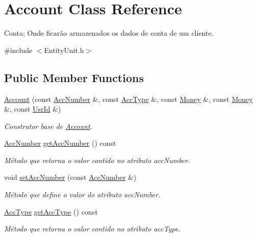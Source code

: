 \hypertarget{classAccount}{\section{Account Class Reference}
\label{d7/d10/classAccount}
}


Conta; Onde ficarão armazenados os dados de conta de um cliente.  




{\ttfamily \#include $<$Entity\-Unit.\-h$>$}

\subsection*{Public Member Functions}
\begin{DoxyCompactItemize}
\item 
\hyperlink{classAccount_a94113be123fc89c3de8461cbb8251c83}{Account} (const \hyperlink{classAccNumber}{Acc\-Number} \&, const \hyperlink{classUsrType}{Acc\-Type} \&, const \hyperlink{classMoney}{Money} \&, const \hyperlink{classMoney}{Money} \&, const \hyperlink{classUsrId}{Usr\-Id} \&)
\begin{DoxyCompactList}\small\item\em Construtor base de \hyperlink{classAccount}{Account}. \end{DoxyCompactList}\item 
\hyperlink{classAccNumber}{Acc\-Number} \hyperlink{classAccount_a74f26f24e13e66a055bb8441dfb3d881}{get\-Acc\-Number} () const 
\begin{DoxyCompactList}\small\item\em Método que retorna o valor contido no atributo acc\-Number. \end{DoxyCompactList}\item 
void \hyperlink{classAccount_a3e669090168f13d2a8269af456546a1e}{set\-Acc\-Number} (const \hyperlink{classAccNumber}{Acc\-Number} \&)
\begin{DoxyCompactList}\small\item\em Método que define o valor do atributo acc\-Number. \end{DoxyCompactList}\item 
\hyperlink{classUsrType}{Acc\-Type} \hyperlink{classAccount_a34e1f7e507d7abdf575e4833d6f8d36b}{get\-Acc\-Type} () const 
\begin{DoxyCompactList}\small\item\em Método que retorna o valor contido no atributo acc\-Type. \end{DoxyCompactList}\item 

\end{DoxyCompactItemize}
